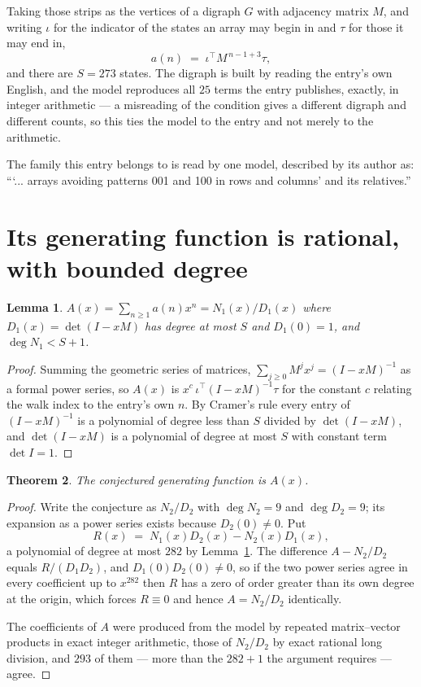 \documentclass[11pt,a4paper]{article}
\theoremstyle{plain}
\newtheorem{theorem}{Theorem}
\newtheorem{lemma}[theorem]{Lemma}
\theoremstyle{definition}
\begin{document}
Taking those strips as the vertices of a digraph $G$ with adjacency matrix $M$, and writing
$\iota$ for the indicator of the states an array may begin in and $\tau$ for those it may end
in,
\[
a(n)\;=\;\iota^{\!\top}M^{\,n-1+3}\tau ,
\]
and there are $S=273$ states. The digraph is built by reading the entry's own English, and the
model reproduces all $25$ terms the entry publishes, exactly, in integer arithmetic --- a
misreading of the condition gives a different digraph and different counts, so this ties the
model to the entry and not merely to the arithmetic.

The family this entry belongs to is read by one model, described by its author as: ```... arrays avoiding patterns 001 and 100 in rows and columns' and its relatives.''


\section{Its generating function is rational, with bounded degree}

\begin{lemma}\label{lem:rat}
$A(x)=\sum_{n\ge1}a(n)x^n=N_1(x)/D_1(x)$ where $D_1(x)=\det(I-xM)$ has degree at most
$S$ and $D_1(0)=1$, and $\deg N_1<S+1$.
\end{lemma}

\begin{proof}
Summing the geometric series of matrices, $\sum_{j\ge0}M^jx^j=(I-xM)^{-1}$ as a formal
power series, so $A(x)$ is $x^{c}\,\iota^{\!\top}(I-xM)^{-1}\tau$ for the constant $c$
relating the walk index to the entry's own $n$. By Cramer's rule every entry of
$(I-xM)^{-1}$ is a polynomial of degree less than $S$ divided by $\det(I-xM)$, and
$\det(I-xM)$ is a polynomial of degree at most $S$ with constant term $\det I=1$.
\end{proof}

\begin{theorem}
The conjectured generating function is $A(x)$.
\end{theorem}

\begin{proof}
Write the conjecture as $N_2/D_2$ with $\deg N_2=9$ and $\deg D_2=9$; its expansion as a
power series exists because $D_2(0)\neq0$. Put
\[
R(x)\;=\;N_1(x)D_2(x)-N_2(x)D_1(x),
\]
a polynomial of degree at most $282$ by Lemma~\ref{lem:rat}. The difference
$A-N_2/D_2$ equals $R/(D_1D_2)$, and $D_1(0)D_2(0)\neq0$, so if the two power series agree in
every coefficient up to $x^{282}$ then $R$ has a zero of order greater than its own
degree at the origin, which forces $R\equiv0$ and hence $A=N_2/D_2$ identically.

The coefficients of $A$ were produced from the model by repeated matrix--vector products in
exact integer arithmetic, those of $N_2/D_2$ by exact rational long division, and $293$
of them --- more than the $282+1$ the argument requires --- agree.
\end{proof}
\end{document}
